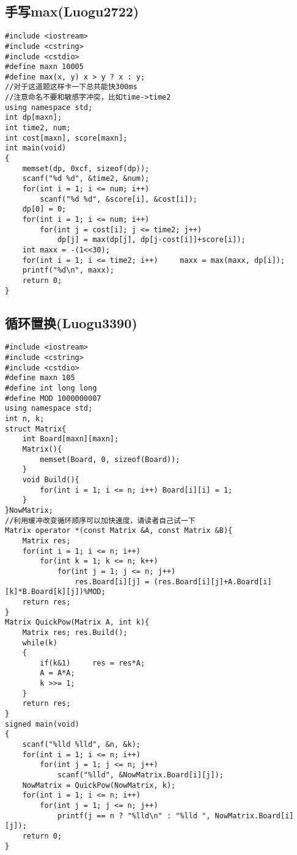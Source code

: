 \documentclass[UTF8]{ctexart}
\begin{document}
	\subsection{手写max(Luogu2722)}
	{\setmainfont{Consolas}
\begin{lstlisting}
#include <iostream>
#include <cstring>
#include <cstdio>
#define maxn 10005
#define max(x, y) x > y ? x : y;
//对于这道题这样卡一下总共能快300ms
//注意命名不要和敏感字冲突，比如time->time2
using namespace std;
int dp[maxn];
int time2, num;
int cost[maxn], score[maxn];
int main(void)
{
    memset(dp, 0xcf, sizeof(dp));
    scanf("%d %d", &time2, &num);
    for(int i = 1; i <= num; i++)
        scanf("%d %d", &score[i], &cost[i]);
    dp[0] = 0;
    for(int i = 1; i <= num; i++)
        for(int j = cost[i]; j <= time2; j++)
            dp[j] = max(dp[j], dp[j-cost[i]]+score[i]);	
    int maxx = -(1<<30);
    for(int i = 1; i <= time2; i++)		maxx = max(maxx, dp[i]);
    printf("%d\n", maxx);
    return 0;
}	
\end{lstlisting}}
\newpage
	\subsection{循环置换(Luogu3390)}
	{\setmainfont{Consolas}
\begin{lstlisting}
#include <iostream>
#include <cstring>
#include <cstdio>
#define maxn 105
#define int long long
#define MOD 1000000007
using namespace std;
int n, k;
struct Matrix{
    int Board[maxn][maxn];
    Matrix(){
    	memset(Board, 0, sizeof(Board));
    }
    void Build(){
        for(int i = 1; i <= n; i++)	Board[i][i] = 1;
    }
}NowMatrix;
//利用缓冲改变循环顺序可以加快速度，请读者自己试一下
Matrix operator *(const Matrix &A, const Matrix &B){
    Matrix res;
    for(int i = 1; i <= n; i++)
        for(int k = 1; k <= n; k++)
            for(int j = 1; j <= n; j++)
                res.Board[i][j] = (res.Board[i][j]+A.Board[i][k]*B.Board[k][j])%MOD;
    return res;
}
Matrix QuickPow(Matrix A, int k){
    Matrix res;	res.Build();
    while(k)
    {
        if(k&1)		res = res*A;
        A = A*A;
        k >>= 1;
    }
    return res;
}
signed main(void)
{
    scanf("%lld %lld", &n, &k);
    for(int i = 1; i <= n; i++)
        for(int j = 1; j <= n; j++)
            scanf("%lld", &NowMatrix.Board[i][j]);
    NowMatrix = QuickPow(NowMatrix, k);
    for(int i = 1; i <= n; i++)
        for(int j = 1; j <= n; j++)
            printf(j == n ? "%lld\n" : "%lld ", NowMatrix.Board[i][j]);
    return 0;
}
\end{lstlisting}}
\newpage
\end{document}
